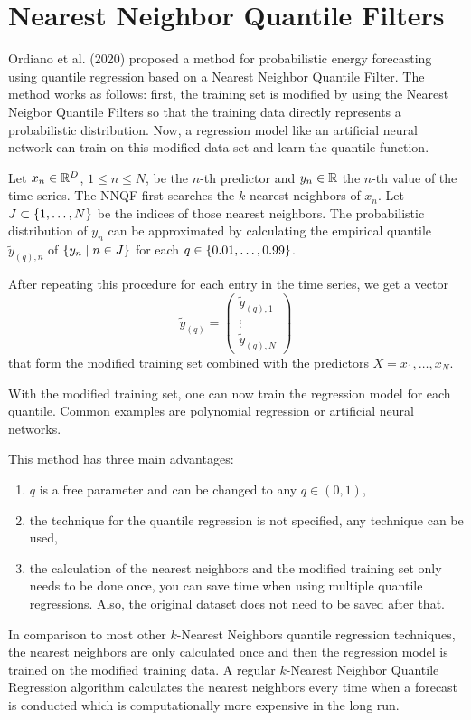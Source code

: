 \section{Nearest Neighbor Quantile Filters}

Ordiano et al. (2020) proposed a method for probabilistic 
energy forecasting using quantile regression based on a Nearest Neighbor 
Quantile Filter. 
The method works as follows: first, the training set is modified 
by using the Nearest Neigbor Quantile Filters so that 
the training data directly represents a probabilistic distribution. 
Now, a regression model like an artificial neural network can 
train on this modified data set and learn the quantile function.

Let \(x_n \in \mathbb{R}^D\), \(1 \leq n \leq N\), be the \(n\)-th predictor 
and \(y_n \in \mathbb{R}\) the \(n\)-th value of the time series. 
The NNQF first searches the \(k\) nearest neighbors of \(x_n\). 
Let \(J \subset \{1, \ldots, N\}\) be the indices of 
those nearest neighbors. 
The probabilistic distribution of \(y_n\) can be approximated 
by calculating the empirical quantile \(\tilde{y}_{(q),n}\) of 
\(\{y_n \;|\; n\in J\}\) for each \(q \in \{0.01, \ldots, 0.99\}\). 

After repeating this procedure for each entry in the time series, 
we get a vector 
\[ \tilde{y}_{(q)} = \begin{pmatrix}
    \tilde{y}_{(q), 1} \\ 
    \vdots \\
    \tilde{y}_{(q), N}
\end{pmatrix} \]
that form the modified training set combined with the 
predictors \(X = x_1, \ldots, x_N\).

With the modified training set, one can now train the regression model 
for each quantile. Common examples are polynomial regression or 
artificial neural networks. 

This method has three main advantages: 
\begin{enumerate}
    \item \(q\) is a free parameter and can be changed to any \(q \in (0,1)\),
    \item the technique for the quantile regression is not specified, 
    any technique can be used,
    \item the calculation of the nearest neighbors and the modified 
    training set only needs to be done once, you can save time when 
    using multiple quantile regressions. Also, the original dataset 
    does not need to be saved after that.
\end{enumerate}

In comparison to most other \(k\)-Nearest Neighbors quantile 
regression techniques, the nearest neighbors are only calculated once 
and then the regression model is trained on the modified training data. 
A regular \(k\)-Nearest Neighbor Quantile Regression algorithm 
calculates the nearest neighbors every time when a forecast is conducted 
which is computationally more expensive in the long run.